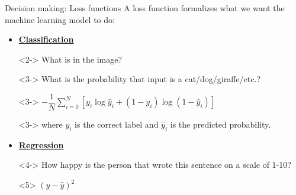 \documentclass[8pt]{beamer}
\begin{document}
	\begin{frame}[t]{Decision making: Loss functions} %
		\vspace{2cm}
		A loss function formalizes what we want the machine learning model to do:\\
		\begin{itemize}
			\item <2-> \textbf{\underline{Classification}}\\
			\item[] <2-> What is in the image?\\
			\item[\rightarrow] <3-> \hspace{0.2cm} What is the probability that input is a cat/dog/giraffe/etc.?
			\item[\rightarrow] <3-> \hspace{0.2cm} $-\dfrac{1}{N}\sum\limits_{i=0}^N \left[ y_i \log \hat{y}_i + (1 - y_i) \log (1 - \hat{y}_i) \right]$
			\item[] <3-> where $y_i$ is the correct label and $\hat{y}_i$ is the predicted probability.
			\item <4-> \textbf{\underline{Regression}}\\
			\item[] <4-> How happy is the person that wrote this sentence on a scale of 1-10?\\
			\item[\rightarrow] <5> \hspace{0.2cm} $\left(y - \hat{y}\right)^2$
		\end{itemize}
	\end{frame}
\end{document}
